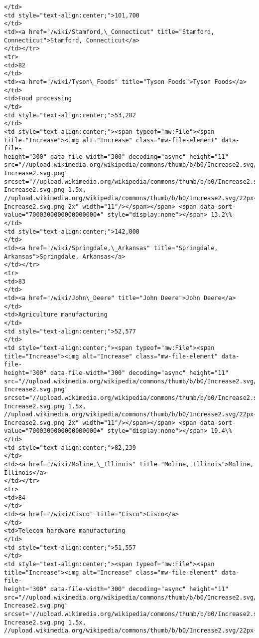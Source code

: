 \documentclass[11pt]{article}
\begin{document}
\begin{Verbatim}[commandchars=\\\{\}]
</td>
<td style="text-align:center;">101,700
</td>
<td><a href="/wiki/Stamford,\_Connecticut" title="Stamford,
Connecticut">Stamford, Connecticut</a>
</td></tr>
<tr>
<td>82
</td>
<td><a href="/wiki/Tyson\_Foods" title="Tyson Foods">Tyson Foods</a>
</td>
<td>Food processing
</td>
<td style="text-align:center;">53,282
</td>
<td style="text-align:center;"><span typeof="mw:File"><span
title="Increase"><img alt="Increase" class="mw-file-element" data-file-
height="300" data-file-width="300" decoding="async" height="11"
src="//upload.wikimedia.org/wikipedia/commons/thumb/b/b0/Increase2.svg/11px-
Increase2.svg.png"
srcset="//upload.wikimedia.org/wikipedia/commons/thumb/b/b0/Increase2.svg/17px-
Increase2.svg.png 1.5x,
//upload.wikimedia.org/wikipedia/commons/thumb/b/b0/Increase2.svg/22px-
Increase2.svg.png 2x" width="11"/></span></span> <span data-sort-
value="7000300000000000000♠" style="display:none"></span> 13.2\%
</td>
<td style="text-align:center;">142,000
</td>
<td><a href="/wiki/Springdale,\_Arkansas" title="Springdale,
Arkansas">Springdale, Arkansas</a>
</td></tr>
<tr>
<td>83
</td>
<td><a href="/wiki/John\_Deere" title="John Deere">John Deere</a>
</td>
<td>Agriculture manufacturing
</td>
<td style="text-align:center;">52,577
</td>
<td style="text-align:center;"><span typeof="mw:File"><span
title="Increase"><img alt="Increase" class="mw-file-element" data-file-
height="300" data-file-width="300" decoding="async" height="11"
src="//upload.wikimedia.org/wikipedia/commons/thumb/b/b0/Increase2.svg/11px-
Increase2.svg.png"
srcset="//upload.wikimedia.org/wikipedia/commons/thumb/b/b0/Increase2.svg/17px-
Increase2.svg.png 1.5x,
//upload.wikimedia.org/wikipedia/commons/thumb/b/b0/Increase2.svg/22px-
Increase2.svg.png 2x" width="11"/></span></span> <span data-sort-
value="7000300000000000000♠" style="display:none"></span> 19.4\%
</td>
<td style="text-align:center;">82,239
</td>
<td><a href="/wiki/Moline,\_Illinois" title="Moline, Illinois">Moline,
Illinois</a>
</td></tr>
<tr>
<td>84
</td>
<td><a href="/wiki/Cisco" title="Cisco">Cisco</a>
</td>
<td>Telecom hardware manufacturing
</td>
<td style="text-align:center;">51,557
</td>
<td style="text-align:center;"><span typeof="mw:File"><span
title="Increase"><img alt="Increase" class="mw-file-element" data-file-
height="300" data-file-width="300" decoding="async" height="11"
src="//upload.wikimedia.org/wikipedia/commons/thumb/b/b0/Increase2.svg/11px-
Increase2.svg.png"
srcset="//upload.wikimedia.org/wikipedia/commons/thumb/b/b0/Increase2.svg/17px-
Increase2.svg.png 1.5x,
//upload.wikimedia.org/wikipedia/commons/thumb/b/b0/Increase2.svg/22px-

\end{Verbatim}
\end{document}
